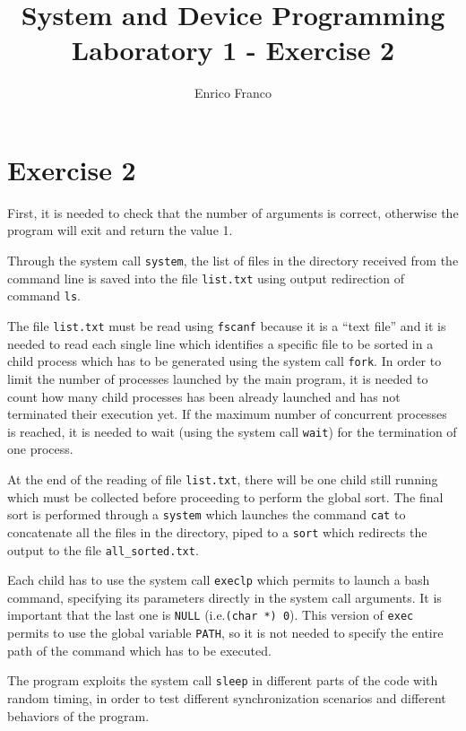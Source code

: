 \documentclass{report}
\author{Enrico Franco}
\title{System and Device Programming \\
	Laboratory 1 - Exercise 2}
\begin{document}
\section*{Exercise 2}
First, it is needed to check that the number of arguments is correct, otherwise the program will exit and return the value 1.

Through the system call \texttt{system}, the list of files in the directory received from the command line is saved into the file \texttt{list.txt} using output redirection of command \texttt{ls}.

The file \texttt{list.txt} must be read using \texttt{fscanf} because it is a ``text file'' and it is needed to read each single line which identifies a specific file to be sorted in a child process which has to be generated using the system call \texttt{fork}.
In order to limit the number of processes launched by the main program, it is needed to count how many child processes has been already launched and has not terminated their execution yet. If the maximum number of concurrent processes is reached, it is needed to wait (using the system call \texttt{wait}) for the termination of one process.

At the end of the reading of file \texttt{list.txt}, there will be one child still running which must be collected before proceeding to perform the global sort. The final sort is performed through a \texttt{system} which launches the command \texttt{cat} to concatenate all the files in the directory, piped to a \texttt{sort} which redirects the output to the file \texttt{all\_sorted.txt}.

Each child has to use the system call \texttt{execlp} which permits to launch a bash command, specifying its parameters directly in the system call arguments. It is important that the last one is \texttt{NULL} (i.e.\@ \texttt{(char *) 0}). This version of \texttt{exec} permits to use the global variable \texttt{PATH}, so it is not needed to specify the entire path of the command which has to be executed.

The program exploits the system call \texttt{sleep} in different parts of the code with random timing, in order to test different synchronization scenarios and different behaviors of the program.
\end{document}
